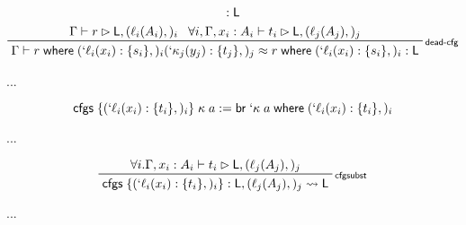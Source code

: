 \documentclass[acmsmall,screen,review]{acmart}
\newcommand{\ms}[1]{\ensuremath{\mathsf{#1}}}
\newcommand{\lbl}[1]{{`#1}}
\newcommand{\lto}{:}
\newcommand{\brb}[2]{\ms{br}\;#1\;#2}
\newcommand{\lbrb}[2]{\brb{\lbl{#1}}{#2}}
\newcommand{\where}[2]{#1\;\ms{where}\;#2}
\newcommand{\wbranch}[3]{#1(#2) \lto \{#3\}}
\newcommand{\lwbranch}[3]{\wbranch{\lbl{#1}}{#2}{#3}}
\newcommand{\cfgsubst}[1]{\ms{cfgs}\;\{#1\}}
\newcommand{\bhyp}[2]{#1 : #2}
\newcommand{\lhyp}[2]{#1(#2)}
\newcommand{\rle}[1]{{\scriptsize\textsf{#1}}}
\newcommand{\haslb}[3]{#1 \vdash #2 \rhd #3}
\newcommand{\lbsubst}[3]{#1: #2 \rightsquigarrow #3}
\newcommand{\teqv}{\approx}
\newcommand{\lbeq}[4]{#1 \vdash #2 \teqv #3 : {#4}}
\begin{document}
\begin{gather*}
{{          : \ms{L}}
      }
    \\
    \prftree[r]{\rle{dead-cfg}}
      {\haslb{\Gamma}{r}{\ms{L}, (\lhyp{\ell_i}{A_i},)_i}}
      {\forall i, \haslb{\Gamma, \bhyp{x_i}{A_i}}{t_i}{\ms{L}, (\lhyp{\ell_j}{A_j},)_j}}
      {\lbeq{\Gamma}{\where{r}{
          (\lwbranch{\ell_i}{x_i}{s_i},)_i
          (\lwbranch{\kappa_j}{y_j}{t_j},)_j}}
        {\where{r}{(\lwbranch{\ell_i}{x_i}{s_i},)_i}}{\ms{L}}}
\end{gather*}

...

\begin{equation*}
  \cfgsubst{(\lwbranch{\ell_i}{x_i}{t_i},)_i}\;\kappa\;a
  := \where{\lbrb{\kappa}{a}}{(\lwbranch{\ell_i}{x_i}{t_i},)_i}
\end{equation*}

...

\begin{equation*}
  \prftree[r]{\rle{cfgsubst}}
    {\forall i. \haslb{\Gamma, \bhyp{x_i}{A_i}}{t_i}{\ms{L}, (\lhyp{\ell_j}{A_j},)_j}}
    {\lbsubst{\cfgsubst{(\lwbranch{\ell_i}{x_i}{t_i},)_i}}{\ms{L}, (\lhyp{\ell_j}{A_j},)_j}{\ms{L}}}
\end{equation*}

...
\end{document}
